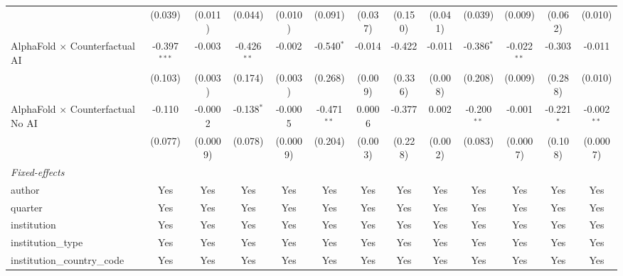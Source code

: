 \begin{tabular}{lcccccccccccc}
                                            & (0.039)        & (0.011)      & (0.044)       & (0.010)       & (0.091)       & (0.037) & (0.150) & (0.041)      & (0.039)       & (0.009)       & (0.062)      & (0.010)\\   
   AlphaFold $\times$ Counterfactual AI     & -0.397$^{***}$ & -0.003       & -0.426$^{**}$ & -0.002        & -0.540$^{*}$  & -0.014  & -0.422  & -0.011       & -0.386$^{*}$  & -0.022$^{**}$ & -0.303       & -0.011\\   
                                            & (0.103)        & (0.003)      & (0.174)       & (0.003)       & (0.268)       & (0.009) & (0.336) & (0.008)      & (0.208)       & (0.009)       & (0.288)      & (0.010)\\   
   AlphaFold $\times$ Counterfactual No AI  & -0.110         & -0.0002      & -0.138$^{*}$  & -0.0005       & -0.471$^{**}$ & 0.0006  & -0.377  & 0.002        & -0.200$^{**}$ & -0.001        & -0.221$^{*}$ & -0.002$^{**}$\\   
                                            & (0.077)        & (0.0009)     & (0.078)       & (0.0009)      & (0.204)       & (0.003) & (0.228) & (0.002)      & (0.083)       & (0.0007)      & (0.108)      & (0.0007)\\   
   \midrule
   \emph{Fixed-effects}\\
   author                                   & Yes            & Yes          & Yes           & Yes           & Yes           & Yes     & Yes     & Yes          & Yes           & Yes           & Yes          & Yes\\  
   quarter                                  & Yes            & Yes          & Yes           & Yes           & Yes           & Yes     & Yes     & Yes          & Yes           & Yes           & Yes          & Yes\\  
   institution                              & Yes            & Yes          & Yes           & Yes           & Yes           & Yes     & Yes     & Yes          & Yes           & Yes           & Yes          & Yes\\  
   institution\_type                        & Yes            & Yes          & Yes           & Yes           & Yes           & Yes     & Yes     & Yes          & Yes           & Yes           & Yes          & Yes\\  
   institution\_country\_code               & Yes            & Yes          & Yes           & Yes           & Yes           & Yes     & Yes     & Yes          & Yes           & Yes           & Yes          & Yes\\  

\end{tabular}

